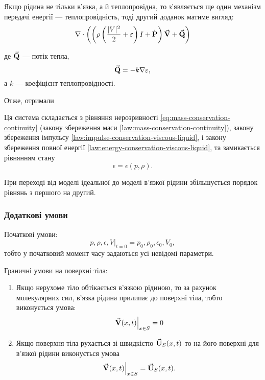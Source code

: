 Якщо рідина не тільки в'язка, а й теплопровідна, то з'являється ще один механізм передачі енергії --- теплопровідність, тоді другий доданок матиме вигляд:
\begin{equation}
	\nabla \cdot \left( \left( \rho \left(\frac{|V|^2}{2} + \varepsilon\right)I + \dot{\textbf{P}}\right) {\vec{\mathbf{V}}} + {\vec{\mathbf{Q}}}\right)
\end{equation}

де ${\vec{\mathbf{Q}}}$ --- потік тепла,
\begin{equation}
	{\vec{\mathbf{Q}}} = - k \nabla \varepsilon,
\end{equation}
а $k$ --- коефіцієнт теплопровідності. \medskip

Отже, отримали
\begin{th_equation}
	Ця система складається з рівняння нерозривності \eqref{eq:mass-conservation-continuity} (закону збереження маси \ref{law:mass-conservation-continuity}), закону збереження імпульсу \ref{law:impulse-conservation-viscous-liquid}, і закону збереження повної енергії \ref{law:energy-conservation-viscous-liquid}, та замикається рівнянням стану
	\begin{equation}
		\epsilon = \epsilon(p, \rho).
	\end{equation}
\end{th_equation}

\begin{remark}
	При переході від моделі ідеальної до моделі в'язкої рідини збільшується порядок рівнянь з першого на другий.
\end{remark}

\subsubsection{Додаткові умови}

Початкові умови:
\begin{equation}
	\left. p, \rho, \epsilon, V \right|_{t = 0} = p_0, \rho_0, \epsilon_0, V_0,
\end{equation}
тобто у початковий момент часу задаються усі невідомі параметри. \medskip

Граничні умови на поверхні тіла:
\begin{enumerate}
	\item Якщо нерухоме тіло обтікається в'язкою рідиною, то за рахунок молекулярних сил, в'язка рідина прилипає до поверхні тіла, тобто виконується умова:
	\begin{equation}
		\left. {\vec{\mathbf{V}}}(x, t) \right|_{x \in S} = 0
	\end{equation}
	\item Якщо поверхня тіла рухається зі швидкістю  ${\vec{\mathbf{U}}}_S(x, t)$ то на його поверхні для в'язкої рідини виконується умова
	\begin{equation}
		\left. {\vec{\mathbf{V}}}(x, t) \right|_{x \in S} = {\vec{\mathbf{U}}}_S(x, t).
	\end{equation}
\end{enumerate}

